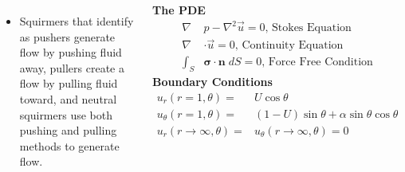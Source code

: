 \documentclass[25pt, a0paper, landscape, blockverticalspace=1cm]{tikzposter}
\begin{document}
\begin{columns}
{\begin{itemize}
\item Squirmers that identify as pushers generate flow by pushing fluid away, pullers create a flow by pulling fluid toward, and neutral squirmers use both pushing and pulling methods to generate flow. 
\end{itemize}




}




{
\begin{center}
\begin{minipage}{.45\linewidth}
    \centering
    \textbf{The PDE}
    \begin{align*}
        \nabla  & p - \nabla^2 \vec{u}  = 0  \text{, Stokes Equation} \\ 
        \nabla  & \cdot \vec{u} = 0  \text{, Continuity Equation} \\
        \int_S  & \bm{\sigma} \cdot \mathbf{n} \; dS = 0 \text{, Force Free Condition} 
    \end{align*}
    \textbf{Boundary Conditions}
    \begin{align*}
        u_r(r=1,\theta) = & U\cos{\theta} \\
        u_{\theta}(r=1,\theta) = & (1-U)\sin{\theta} + \alpha \sin \theta \cos \theta\\
        u_r(r \to \infty, \theta) = & u_{\theta}(r \to \infty, \theta) = 0 \\
    \end{align*}
\end{minipage}\hfill



\begin{minipage}{.45\linewidth}
\centering
\end{minipage}
\end{center}
}



\end{columns}
\end{document}

